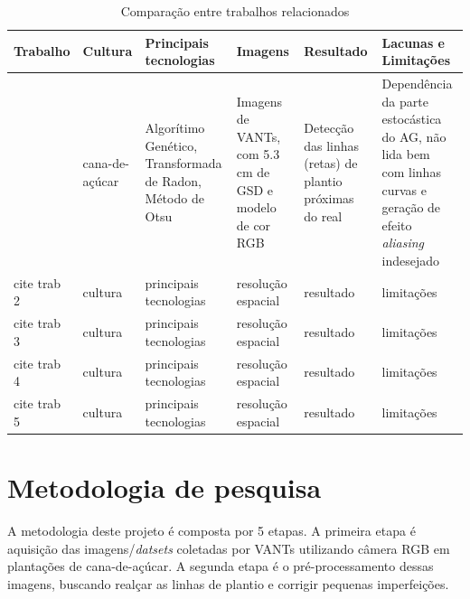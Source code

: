 \documentclass[12pt, a4paper, english, brazil]{article}
\begin{document}
\begin{landscape}
\begin{table}
\centering
\caption{Comparação entre trabalhos relacionados}
\label{tab:trab_rela}
\begin{tabularx}{\linewidth}{|L|L|L|L|L|L|} 
\hline
\textbf{Trabalho} & \textbf{Cultura} & \textbf{Principais tecnologias} & \textbf{Imagens} & \textbf{Resultado} & \textbf{Lacunas e Limitações} \\ \hline
\cite{Silva_Escarpinati_Backes_2021} & cana-de-açúcar & Algorítimo Genético, Transformada de Radon, Método de Otsu & Imagens de VANTs, com 5.3 cm de GSD e modelo de cor RGB & Detecção das linhas (retas) de plantio próximas do real & Dependência da parte estocástica do AG, não lida bem com linhas curvas e geração de efeito \textit{aliasing} indesejado \\ \hline
cite trab 2 & cultura & principais tecnologias & resolução espacial & resultado & limitações \\ \hline
cite trab 3 & cultura & principais tecnologias & resolução espacial & resultado & limitações \\ \hline
cite trab 4 & cultura & principais tecnologias & resolução espacial & resultado & limitações \\ \hline
cite trab 5 & cultura & principais tecnologias & resolução espacial & resultado & limitações \\ \hline
\end{tabularx}
\end{table}
\end{landscape}

\section{Metodologia de pesquisa}

A metodologia deste projeto é composta por 5 etapas. A primeira etapa é aquisição das imagens/\textit{datsets} coletadas por VANTs utilizando câmera RGB em plantações de cana-de-açúcar. A segunda etapa é o pré-processamento dessas imagens, buscando realçar as linhas de plantio e corrigir pequenas imperfeições.
\end{document}
